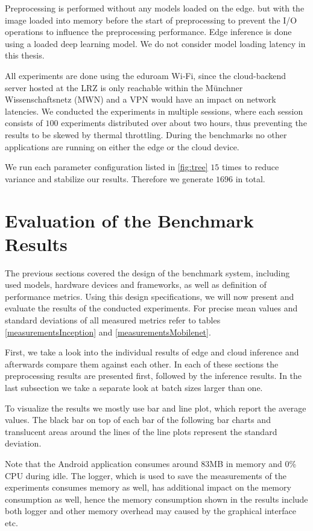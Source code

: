 Preprocessing is performed without any models loaded on the edge. but with the image loaded into memory before the start of preprocessing to prevent the I/O operations to influence the preprocessing performance.
Edge inference is done using a loaded deep learning model. 
We do not consider model loading latency in this thesis.

All experiments are done using the eduroam Wi‑Fi, since the cloud-backend server hosted at the LRZ is only reachable within the Münchner Wissenschaftsnetz (MWN) and a VPN would have an impact on network latencies.
We conducted the experiments in multiple sessions, where each session consists of $100$ experiments distributed over about two hours, thus preventing the results to be skewed by thermal throttling.
During the benchmarks no other applications are running on either the edge or the cloud device.

We run each parameter configuration listed in \ref{fig:tree} $15$ times to reduce variance and stabilize our results. Therefore we generate $1696$ in total.
\section{Evaluation of the Benchmark Results}
\label{chap:Evaluation}
The previous sections covered the design of the benchmark system, including used models, hardware devices and frameworks, as well as definition of performance metrics. Using this design specifications, we will now present and evaluate the results of the conducted experiments.
For precise mean values and standard deviations of all measured metrics refer to tables \ref{measurementsInception} and \ref{measurementsMobilenet}.

First, we take a look into the individual results of edge and cloud inference and afterwards compare them against each other. In each of these sections the preprocessing results are presented first, followed by the inference results.
In the last subsection we take a separate look at batch sizes larger than one.

To visualize the results we mostly use bar and line plot, which report the average values.
The black bar on top of each bar of the following bar charts and translucent areas around the lines of the line plots represent the standard deviation.

Note that the Android application consumes around 83MB in memory and 0\% CPU during idle. The logger, which is used to save the measurements of the experiments consumes memory as well, has additional impact on the memory consumption as well, hence the memory consumption shown in the results include both logger and other memory overhead may caused by the graphical interface etc.


